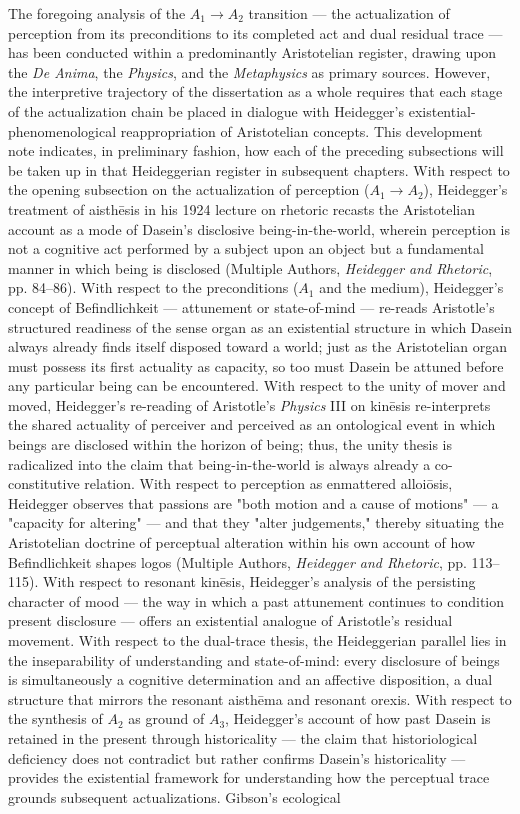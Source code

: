 The foregoing analysis of the $A_1$$\to$$A_2$ transition --- the actualization of perception from its preconditions to its completed act and dual residual trace --- has been conducted within a predominantly Aristotelian register, drawing upon the \textit{De Anima}, the \textit{Physics}, and the \textit{Metaphysics} as primary sources. However, the interpretive trajectory of the dissertation as a whole requires that each stage of the actualization chain be placed in dialogue with Heidegger's existential-phenomenological reappropriation of Aristotelian concepts. This development note indicates, in preliminary fashion, how each of the preceding subsections will be taken up in that Heideggerian register in subsequent chapters. With respect to the opening subsection on the actualization of perception ($A_1$$\to$$A_2$), Heidegger's treatment of aisthēsis in his 1924 lecture on rhetoric recasts the Aristotelian account as a mode of Dasein's disclosive being-in-the-world, wherein perception is not a cognitive act performed by a subject upon an object but a fundamental manner in which being is disclosed (Multiple Authors, \textit{Heidegger and Rhetoric}, pp. 84--86). With respect to the preconditions ($A_1$ and the medium), Heidegger's concept of Befindlichkeit --- attunement or state-of-mind --- re-reads Aristotle's structured readiness of the sense organ as an existential structure in which Dasein always already finds itself disposed toward a world; just as the Aristotelian organ must possess its first actuality as capacity, so too must Dasein be attuned before any particular being can be encountered. With respect to the unity of mover and moved, Heidegger's re-reading of Aristotle's \textit{Physics} III on kinēsis re-interprets the shared actuality of perceiver and perceived as an ontological event in which beings are disclosed within the horizon of being; thus, the unity thesis is radicalized into the claim that being-in-the-world is always already a co-constitutive relation. With respect to perception as enmattered alloiōsis, Heidegger observes that passions are "both motion and a cause of motions" --- a "capacity for altering" --- and that they "alter judgements," thereby situating the Aristotelian doctrine of perceptual alteration within his own account of how Befindlichkeit shapes logos (Multiple Authors, \textit{Heidegger and Rhetoric}, pp. 113--115). With respect to resonant kinēsis, Heidegger's analysis of the persisting character of mood --- the way in which a past attunement continues to condition present disclosure --- offers an existential analogue of Aristotle's residual movement. With respect to the dual-trace thesis, the Heideggerian parallel lies in the inseparability of understanding and state-of-mind: every disclosure of beings is simultaneously a cognitive determination and an affective disposition, a dual structure that mirrors the resonant aisthēma and resonant orexis. With respect to the synthesis of $A_2$ as ground of $A_3$, Heidegger's account of how past Dasein is retained in the present through historicality --- the claim that historiological deficiency does not contradict but rather confirms Dasein's historicality --- provides the existential framework for understanding how the perceptual trace grounds subsequent actualizations. Gibson's ecological 